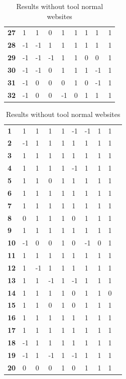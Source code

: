 \documentclass[twoside,openright,notitlepage]{uva-bachelor-thesis}
\begin{document}
\begin{table}[h!]
{\begin{tabular}{lllllllll}
\textbf{27} & 1  & 1  & 0  & 1  & 1  & 1  & 1  & 1 \\
\textbf{28} & -1 & -1 & 1  & 1  & 1  & 1  & 1  & 1 \\
\textbf{29} & -1 & -1 & -1 & 1  & 1  & 0  & 0  & 1 \\
\textbf{30} & -1 & -1 & 0  & 1  & 1  & 1  & -1 & 1 \\
\textbf{31} & -1 & 0  & 0  & 0  & 1  & 0  & -1 & 1 \\
\textbf{32} & -1 & 0  & 0  & -1 & 0  & 1  & 1  & 1
\end{tabular}
\caption{Results without tool normal websites}
}
\parbox{.45\linewidth}{
\centering
\begin{tabular}{llllllllll}
\textbf{1}  & 1  & 1  & 1  & 1  & -1 & -1 & 1  & 1 \\
\textbf{2 } & -1 & 1  & 1  & 1  & 1  & 1  & 1  & 1 \\
\textbf{3 } & 1  & 1  & 1  & 1  & 1  & 1  & 1  & 1 \\
\textbf{4 } & 1  & 1  & 1  & 1  & -1 & 1  & 1  & 1 \\
\textbf{5 } & 1  & 1  & 0  & 1  & 1  & 1  & 1  & 1 \\
\textbf{6 } & 1  & 1  & 1  & 1  & 1  & 1  & 1  & 1 \\
\textbf{7 } & 1  & 1  & 1  & 1  & 1  & 1  & 1  & 1 \\
\textbf{8 } & 0  & 1  & 1  & 1  & 0  & 1  & 1  & 1 \\
\textbf{9 } & 1  & 1  & 1  & 1  & 1  & 1  & 1  & 1 \\
\textbf{10} & -1 & 0  & 0  & 1  & 0  & -1 & 0  & 1 \\
\textbf{11} & 1  & 1  & 1  & 1  & 1  & 1  & 1  & 1 \\
\textbf{12} & 1  & -1 & 1  & 1  & 1  & 1  & 1  & 1 \\
\textbf{13} & 1  & 1  & -1 & 1  & -1 & 1  & 1  & 1 \\
\textbf{14} & 1  & 1  & 1  & 1  & 0  & 1  & 1  & 0 \\
\textbf{15} & 1  & 1  & 0  & 1  & 0  & 1  & 1  & 1 \\
\textbf{16} & 1  & 1  & 1  & 1  & 1  & 1  & 1  & 1 \\
\textbf{17} & 1  & 1  & 1  & 1  & 1  & 1  & 1  & 1 \\
\textbf{18} & -1 & 1  & 1  & 1  & 1  & 1  & 1  & 1 \\
\textbf{19} & -1 & 1  & -1 & 1  & -1 & 1  & 1  & 1 \\
\textbf{20} & 0  & 0  & 0  & 1  & 0  & 1  & 1  & 1 \\

\end{tabular}}
\end{table}
\end{document}
